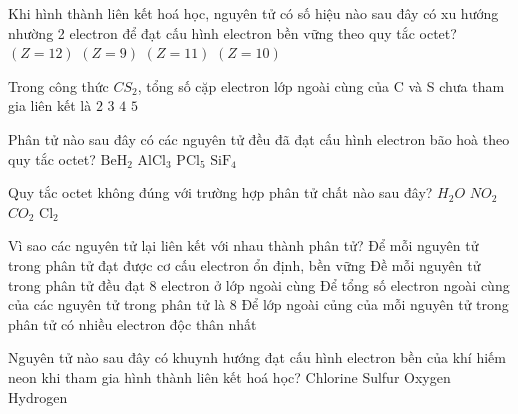 \begin{ex}
	Khi hình thành liên kết hoá học, nguyên tử có số hiệu nào sau đây có xu hướng nhường 2 electron để đạt cấu hình electron bền vững theo quy tắc octet?
	\choice
	{\True $(Z=12)$}
	{$(Z=9)$}
	{$(Z=11)$}
	{$(Z=10)$}
\end{ex}
\begin{ex}
	Trong công thức $CS_2$, tổng số cặp electron lớp ngoài cùng của C và S chưa tham gia liên kết là
	\choice
	{$2$}
	{$3$}
	{\True $4$}
	{$5$}
\end{ex}
\begin{ex}
	Phân tử nào sau đây có các nguyên tử đều đã đạt cấu hình electron bão hoà theo quy tắc octet?
	\choice
	{$\mathrm{BeH}_2$}
	{$\mathrm{AlCl}_3$}
	{$\mathrm{PCl}_5$}
	{\True $\mathrm{SiF}_4$}
\end{ex}
\begin{ex}
	Quy tắc octet không đúng với trường hợp phân tử chất nào sau đây?
	\choice
	{$H_2O$}
	{\True $NO_2$}
	{$CO_2$}
	{$\mathrm{Cl}_2$}
\end{ex}
\begin{ex}
	Vì sao các nguyên tử lại liên kết với nhau thành phân tử?
	\choice
	{\True Để mỗi nguyên tử trong phân tử đạt được cơ cấu electron ổn định, bền vững}
	{Đề mỗi nguyên tử trong phân tử đều đạt 8 electron ở lớp ngoài cùng}
	{Để tổng số electron ngoài cùng của các nguyên tử trong phân tử là 8}
	{Để lớp ngoài củng của mỗi nguyên tử trong phân tử có nhiều electron độc thân nhất}
\end{ex}
\begin{ex}
	Nguyên tử nào sau đây có khuynh hướng đạt cấu hình electron bền của khí hiếm neon khi tham gia hình thành liên kết hoá học?
	\choice
	{\True Chlorine}
	{Sulfur}
	{Oxygen}
	{Hydrogen}
\end{ex}
